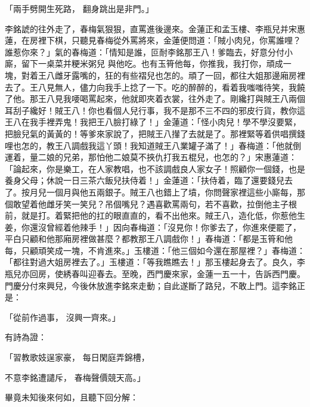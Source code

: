 「兩手劈開生死路，  翻身跳出是非門。」

李銘諕的往外走了，春梅氣狠狠，直罵進後邊來。金蓮正和孟玉樓、李瓶兒并宋惠蓮，在房裡下棋，只聽見春梅從外罵將來，金蓮便問道：「賊小肉兒，你罵誰哩？誰惹你來？」氣的春梅道：「情知是誰，叵耐李銘那王八！爹臨去，好意分付小廝，留下一桌菜并粳米粥兒 與他吃。也有玉筲他每，你推我，我打你，頑成一塊，對着王八雌牙露嘴的，狂的有些褶兒也怎的。頑了一回，都往大姐那邊廂房裡去了。王八見無人，儘力向我手上捻了一下。吃的醉醉的，看着我嗤嗤待笑，我饒了他。那王八見我喓喝罵起來，他就即夾着衣裳，往外走了。剛纔打與賊王八兩個耳刮子纔好！賊王八！你也看個人兒行事，我不是那不三不四的邪皮行貨，教你這王八在我手裡弄鬼！我把王八臉打綠了！」金蓮道：「怪小肉兒！學不學沒要緊，把臉兒氣的黃黃的！等爹來家說了，把賊王八攆了去就是了。那裡緊等着供唱撰錢哩也怎的，教王八調戲我這丫頭！我知道賊王八業罐子滿了！」春梅道：「他就倒運着，量二娘的兄弟，那怕他二娘莫不挾仇打我五棍兒，也怎的？」宋惠蓮道：「論起來，你是樂工，在人家教唱，也不該調戲良人家女子！照顧你一個錢，也是養身父母；休說一日三茶六飯兒扶侍着！」金蓮道：「扶侍着，臨了還要錢兒去了。按月兒一個月與他五兩銀子。賊王八也錯上了墳，你問聲家裡這些小廝每，那個敢望着他雌牙笑一笑兒？吊個嘴兒？遇喜歡罵兩句，若不喜歡，拉倒他主子根前，就是打。着緊把他的扛的眼直直的，看不出他來。賊王八，造化低，你惹他生姜，你還沒曾經着他辣手！」因向春梅道：「沒見你！你爹去了，你進來便罷了，平白只顧和他那廂房裡做甚麼？都教那王八調戲你！」春梅道：「都是玉筲和他每，只顧頑笑成一塊，不肯進來。」玉樓道：「他三個如今還在那屋裡？」春梅道：「都往對過大姐房裡去了。」玉樓道：「等我瞧瞧去！」那玉樓起身去了。良久，李瓶兒亦回房，使綉春叫迎春去。至晚，西門慶來家，金蓮一五一十，告訴西門慶。門慶分付來興兒，今後休放進李銘來走動；自此遂斷了路兒，不敢上門。這李銘正是：

「從前作過事，  沒興一齊來。」

有詩為證：

「習教歌妓逞家豪，  每日閑庭弄錦槽，

不意李銘遭譴斥，  春梅聲價競天高。」

畢竟未知後來何如，且聽下回分解：

